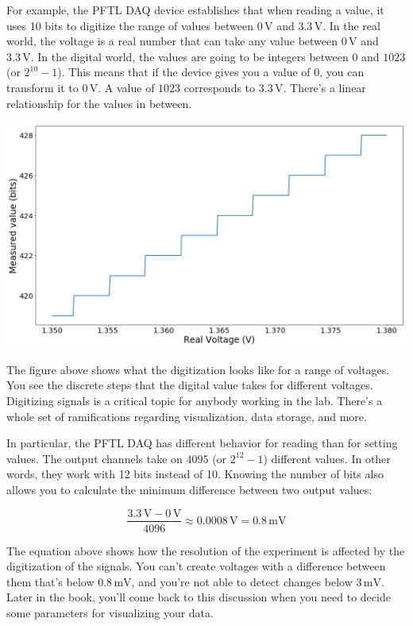 For example, the {PFTL DAQ} device establishes that when reading a value, it uses 10 bits to digitize the range of values between $0\,\textrm{V}$ and $3.3\,\textrm{V}$. In the real world, the voltage is a real number that can take any value between $0\,\textrm{V}$ and $3.3\,\textrm{V}$. In the digital world, the values are going to be integers between $0$ and $1023$ (or $2^{10}-1$). This means that if the device gives you a value of $0$, you can transform it to $0\,\textrm{V}$. A value of $1023$ corresponds to $3.3\,\textrm{V}$. There's a linear relationship for the values in between.

\begin{center}
\includegraphics[width=.6\textwidth]{images/Chapter_03/digitalization.png}
\end{center}

The figure above shows what the digitization looks like for a range of voltages. You see the discrete steps that the digital value takes for different voltages. Digitizing signals is a critical topic for anybody working in the lab. There's a whole set of ramifications regarding visualization, data storage, and more.

In particular, the {PFTL DAQ} has different behavior for reading than for setting values. The output channels take on $4095$ (or $2^{12}-1$) different values. In other words, they work with 12 bits instead of 10. Knowing the number of bits also allows you to calculate the minimum difference between two output values:

\begin{equation*}
 \frac{3.3\,\textrm{V} - 0\,\textrm{V}}{4096} \approx 0.0008\,\textrm{V} = 0.8\,\textrm{mV}
\end{equation*}

The equation above shows how the resolution of the experiment is affected by the digitization of the signals. You can't create voltages with a difference between them that's below $0.8\,\textrm{mV}$, and you're not able to detect changes below $3\,\textrm{mV}$. Later in the book, you'll come back to this discussion when you need to decide some parameters for visualizing your data.

